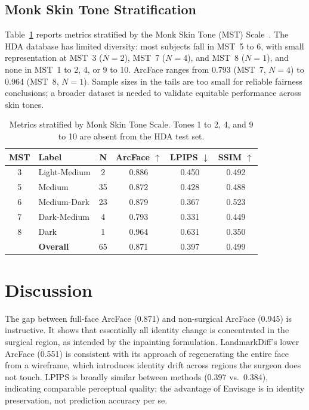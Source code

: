 \documentclass[twocolumn]{article}
\newcommand{\method}{Envisage}
\begin{document}
\subsection{Monk Skin Tone Stratification}

Table~\ref{tab:fairness} reports metrics stratified by the Monk Skin Tone
(MST) Scale~\cite{monk2023monk}. The HDA database has limited diversity:
most subjects fall in MST~5 to 6, with small representation at MST~3
($N{=}2$), MST~7 ($N{=}4$), and MST~8 ($N{=}1$), and none in
MST~1 to 2, 4, or 9 to 10. ArcFace ranges from 0.793 (MST~7, $N{=}4$) to
0.964 (MST~8, $N{=}1$). Sample sizes in the tails are too small for
reliable fairness conclusions; a broader dataset is needed to validate
equitable performance across skin tones.

\begin{table}[t]
\centering
\caption{Metrics stratified by Monk Skin Tone Scale. Tones 1 to 2, 4, and 9 to 10
are absent from the HDA test set.}
\label{tab:fairness}
\begin{tabular}{@{}clcccc@{}}
\toprule
\textbf{MST} & \textbf{Label} & \textbf{N} &
\textbf{ArcFace} $\uparrow$ & \textbf{LPIPS} $\downarrow$ &
\textbf{SSIM} $\uparrow$ \\
\midrule
3  & Light-Medium & 2  & 0.886 & 0.450 & 0.492 \\
5  & Medium       & 35 & 0.872 & 0.428 & 0.488 \\
6  & Medium-Dark  & 23 & 0.879 & 0.367 & 0.523 \\
7  & Dark-Medium  & 4  & 0.793 & 0.331 & 0.449 \\
8  & Dark         & 1  & 0.964 & 0.631 & 0.350 \\
\midrule
   & \textbf{Overall} & 65 & 0.871 & 0.397 & 0.499 \\
\bottomrule
\end{tabular}
\end{table}

\section{Discussion}
\label{sec:discussion}

The gap between full-face ArcFace (0.871) and non-surgical ArcFace
(0.945) is instructive. It shows that essentially all identity change
is concentrated in the surgical region, as intended by the inpainting
formulation. LandmarkDiff's lower ArcFace
(0.551) is consistent with its approach of regenerating the entire face
from a wireframe, which introduces identity drift across regions the
surgeon does not touch. LPIPS is broadly similar between methods (0.397
vs.\ 0.384), indicating comparable perceptual quality; the advantage of
\method{} is in identity preservation, not prediction accuracy per se.
\end{document}
